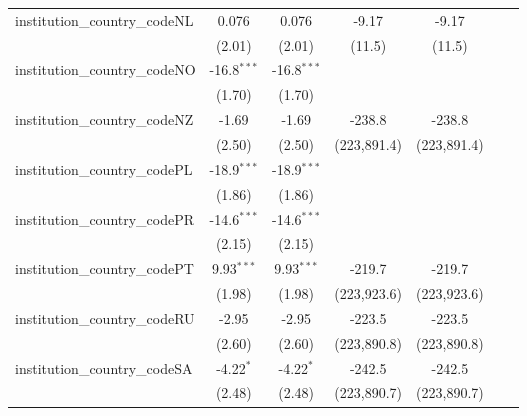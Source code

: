 \begin{tabular}{lcccccc}
   institution\_country\_codeNL          & 0.076         & 0.076         & -9.17         & -9.17         &               &   \\   
                                         & (2.01)        & (2.01)        & (11.5)        & (11.5)        &               &   \\   
   institution\_country\_codeNO          & -16.8$^{***}$ & -16.8$^{***}$ &               &               &               &   \\   
                                         & (1.70)        & (1.70)        &               &               &               &   \\   
   institution\_country\_codeNZ          & -1.69         & -1.69         & -238.8        & -238.8        &               &   \\   
                                         & (2.50)        & (2.50)        & (223,891.4)   & (223,891.4)   &               &   \\   
   institution\_country\_codePL          & -18.9$^{***}$ & -18.9$^{***}$ &               &               &               &   \\   
                                         & (1.86)        & (1.86)        &               &               &               &   \\   
   institution\_country\_codePR          & -14.6$^{***}$ & -14.6$^{***}$ &               &               &               &   \\   
                                         & (2.15)        & (2.15)        &               &               &               &   \\   
   institution\_country\_codePT          & 9.93$^{***}$  & 9.93$^{***}$  & -219.7        & -219.7        &               &   \\   
                                         & (1.98)        & (1.98)        & (223,923.6)   & (223,923.6)   &               &   \\   
   institution\_country\_codeRU          & -2.95         & -2.95         & -223.5        & -223.5        &               &   \\   
                                         & (2.60)        & (2.60)        & (223,890.8)   & (223,890.8)   &               &   \\   
   institution\_country\_codeSA          & -4.22$^{*}$   & -4.22$^{*}$   & -242.5        & -242.5        &               &   \\   
                                         & (2.48)        & (2.48)        & (223,890.7)   & (223,890.7)   &               &   \\   

\end{tabular}
